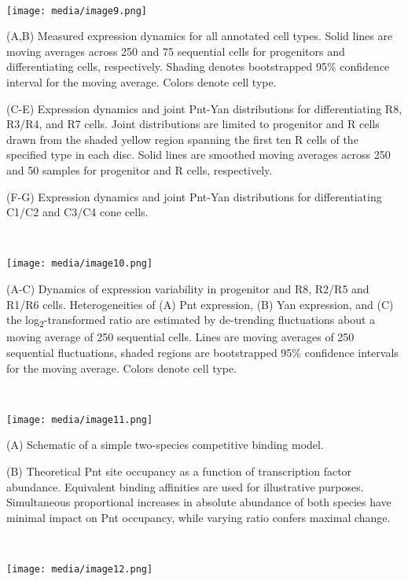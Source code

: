 \textbf{\\
}

\texttt{[image: media/image9.png]}

(A,B) Measured expression dynamics for all annotated cell types. Solid lines are moving averages across 250 and 75 sequential cells for progenitors and differentiating cells, respectively. Shading denotes bootstrapped 95\% confidence interval for the moving average. Colors denote cell type.

(C-E) Expression dynamics and joint Pnt-Yan distributions for differentiating R8, R3/R4, and R7 cells. Joint distributions are limited to progenitor and R cells drawn from the shaded yellow region spanning the first ten R cells of the specified type in each disc. Solid lines are smoothed moving averages across 250 and 50 samples for progenitor and R cells, respectively.

(F-G) Expression dynamics and joint Pnt-Yan distributions for differentiating C1/C2 and C3/C4 cone cells.

\textbf{\\
}

\texttt{[image: media/image10.png]}

(A-C) Dynamics of expression variability in progenitor and R8, R2/R5 and R1/R6 cells. Heterogeneities of (A) Pnt expression, (B) Yan expression, and (C) the log\textsubscript{2}-transformed ratio are estimated by de-trending fluctuations about a moving average of 250 sequential cells. Lines are moving averages of 250 sequential fluctuations, shaded regions are bootstrapped 95\% confidence intervals for the moving average. Colors denote cell type.

\textbf{\\
}

\texttt{[image: media/image11.png]}

(A) Schematic of a simple two-species competitive binding model.

(B) Theoretical Pnt site occupancy as a function of transcription factor abundance. Equivalent binding affinities are used for illustrative purposes. Simultaneous proportional increases in absolute abundance of both species have minimal impact on Pnt occupancy, while varying ratio confers maximal change.

\textbf{\\
}

\texttt{[image: media/image12.png]}

